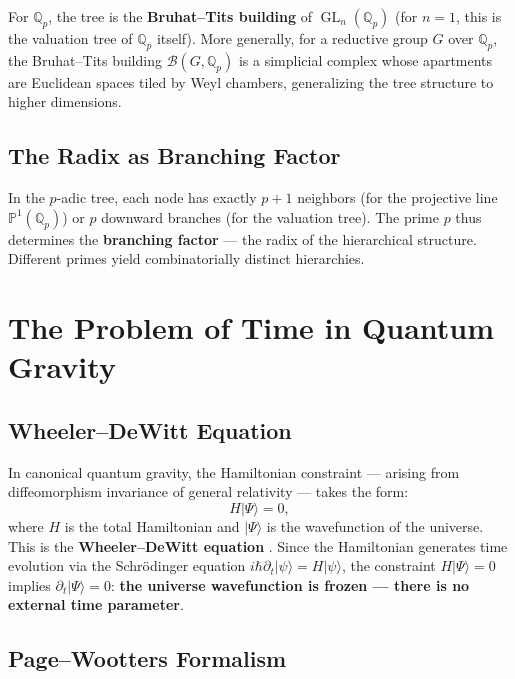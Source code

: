 \documentclass[12pt,a4paper]{article}
\theoremstyle{definition}
\newcommand{\Qp}{\mathbb{Q}_p}
\newcommand{\GL}{\operatorname{GL}}
\newcommand{\ket}[1]{|#1\rangle}
\newcommand{\bt}{\mathcal{B}}
\begin{document}
For $\Qp$, the tree is the \textbf{Bruhat--Tits building} of $\GL_n(\Qp)$ (for $n=1$, this is the valuation tree of $\Qp$ itself). More generally, for a reductive group $G$ over $\Qp$, the Bruhat--Tits building $\bt(G,\Qp)$ is a simplicial complex whose apartments are Euclidean spaces tiled by Weyl chambers, generalizing the tree structure to higher dimensions.

\subsection{The Radix as Branching Factor}

In the $p$-adic tree, each node has exactly $p+1$ neighbors (for the projective line $\mathbb{P}^1(\Qp)$) or $p$ downward branches (for the valuation tree). The prime $p$ thus determines the \textbf{branching factor} --- the radix of the hierarchical structure. Different primes yield combinatorially distinct hierarchies.

\section{The Problem of Time in Quantum Gravity}

\subsection{Wheeler--DeWitt Equation}

In canonical quantum gravity, the Hamiltonian constraint --- arising from diffeomorphism invariance of general relativity --- takes the form:
\begin{equation}
H \ket{\Psi} = 0,
\end{equation}
where $H$ is the total Hamiltonian and $\ket{\Psi}$ is the wavefunction of the universe. This is the \textbf{Wheeler--DeWitt equation} \cite{dewitt1967quantum}. Since the Hamiltonian generates time evolution via the Schr\"odinger equation $i\hbar \partial_t \ket{\psi} = H \ket{\psi}$, the constraint $H\ket{\Psi}=0$ implies $\partial_t \ket{\Psi} = 0$: \textbf{the universe wavefunction is frozen --- there is no external time parameter}.

\subsection{Page--Wootters Formalism}
\end{document}
